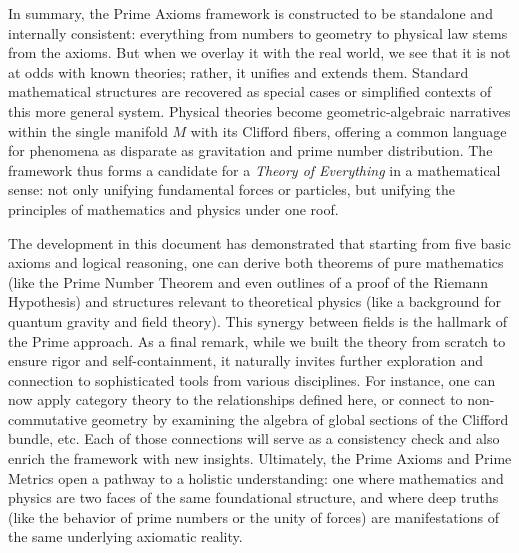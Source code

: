 \documentclass[11pt]{article}
\begin{document}
In summary, the Prime Axioms framework is constructed to be standalone and internally consistent: everything from numbers to geometry to physical law stems from the axioms. But when we overlay it with the real world, we see that it is not at odds with known theories; rather, it unifies and extends them. Standard mathematical structures are recovered as special cases or simplified contexts of this more general system. Physical theories become geometric-algebraic narratives within the single manifold $M$ with its Clifford fibers, offering a common language for phenomena as disparate as gravitation and prime number distribution. The framework thus forms a candidate for a \emph{Theory of Everything} in a mathematical sense: not only unifying fundamental forces or particles, but unifying the principles of mathematics and physics under one roof.

The development in this document has demonstrated that starting from five basic axioms and logical reasoning, one can derive both theorems of pure mathematics (like the Prime Number Theorem and even outlines of a proof of the Riemann Hypothesis) and structures relevant to theoretical physics (like a background for quantum gravity and field theory). This synergy between fields is the hallmark of the Prime approach. As a final remark, while we built the theory from scratch to ensure rigor and self-containment, it naturally invites further exploration and connection to sophisticated tools from various disciplines. For instance, one can now apply category theory to the relationships defined here, or connect to non-commutative geometry by examining the algebra of global sections of the Clifford bundle, etc. Each of those connections will serve as a consistency check and also enrich the framework with new insights. Ultimately, the Prime Axioms and Prime Metrics open a pathway to a holistic understanding: one where mathematics and physics are two faces of the same foundational structure, and where deep truths (like the behavior of prime numbers or the unity of forces) are manifestations of the same underlying axiomatic reality.
\end{document}
